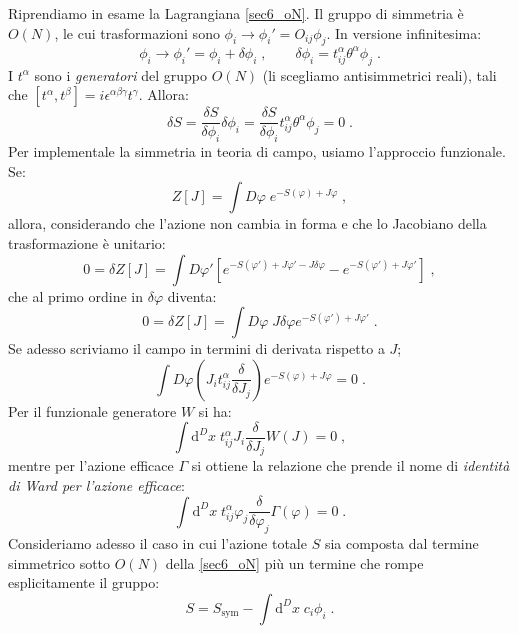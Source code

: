 \documentclass[12pt,a4paper]{article}
\theoremstyle{definition}
\numberwithin{equation}{section}
\newcommand{\diff}[1][]{\mathrm{d}#1}
\begin{document}
Riprendiamo in esame la Lagrangiana \eqref{sec6_oN}. Il gruppo di simmetria è $O(N)$, le cui trasformazioni sono $\phi_i\to \phi_i'=O_{ij}\phi_j$. In versione infinitesima:
\begin{equation}
\phi_i\to \phi_i'=\phi_i+\delta\phi_i\;,\qquad \delta\phi_i=t^{\alpha}_{ij}\theta^{\alpha}\phi_j\;.
\end{equation}
I $t^{\alpha}$ sono i \emph{generatori} del gruppo $O(N)$ (li scegliamo antisimmetrici reali), tali che $[t^{\alpha},t^{\beta}]=i\epsilon^{\alpha\beta\gamma}t^{\gamma}$. Allora:
\begin{equation}
\delta S=\frac{\delta S}{\delta\phi_i}\delta\phi_i=\frac{\delta S}{\delta\phi_i}t^{\alpha}_{ij}\theta^{\alpha}\phi_j=0\;.
\end{equation}
Per implementale la simmetria in teoria di campo, usiamo l'approccio funzionale. Se:
$$
Z[J]=\int D\varphi\;e^{-S(\varphi)+J\varphi}\;,
$$
allora, considerando che l'azione non cambia in forma e che lo Jacobiano della trasformazione è unitario:
\begin{equation}
0=\delta Z[J]=\int D\varphi'\left[e^{-S(\varphi')+J\varphi'-J\delta\varphi}-e^{-S(\varphi')+J\varphi'}\right]\;,
\end{equation}
che al primo ordine in $\delta\varphi$ diventa:
\begin{equation}
0=\delta Z[J]=\int D\varphi\; J\delta\varphi e^{-S(\varphi')+J\varphi'}\;.
\end{equation}
Se adesso scriviamo il campo in termini di derivata rispetto a $J$;
\begin{equation}
\int D\varphi\left(J_it^{\alpha}_{ij}\frac{\delta}{\delta J_j}\right)e^{-S(\varphi)+J\varphi}=0\;.
\end{equation}
Per il funzionale generatore $W$ si ha:
\begin{equation}
\int\diff^D{x}\; t^{\alpha}_{ij}J_i\frac{\delta}{\delta J_j}W(J)=0\;,
\end{equation}
mentre per l'azione efficace $\Gamma$ si ottiene la relazione che prende il nome di \emph{identità di Ward per l'azione efficace}:
\begin{equation}
\int\diff^D{x}\; t^{\alpha}_{ij}\varphi_j\frac{\delta}{\delta\varphi_j}\Gamma(\varphi)=0\;.
\end{equation}
Consideriamo adesso il caso in cui l'azione totale $S$ sia composta dal termine simmetrico sotto $O(N)$ della \eqref{sec6_oN} più un termine che rompe esplicitamente il gruppo:
\begin{equation}
S=S_{\mathrm{sym}}-\int\diff^{D}x\; c_i\phi_i\;.
\end{equation}
\end{document}

